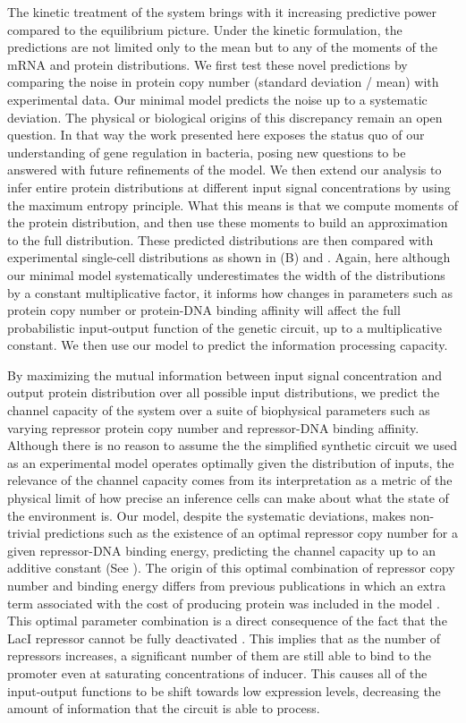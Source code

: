 The kinetic treatment of the system brings with it increasing predictive power
compared to the equilibrium picture. Under the kinetic formulation, the
predictions are not limited only to the mean but to any of the moments of the
mRNA and protein distributions. We first test these novel predictions by
comparing the noise in protein copy number (standard deviation / mean) with
experimental data. Our minimal model predicts the noise up to a systematic
deviation. The physical or biological origins of this discrepancy remain an
open question. In that way the work presented here exposes the status quo of
our understanding of gene regulation in bacteria, posing new questions to be
answered with future refinements of the model. We then extend our analysis to
infer entire protein distributions at different input signal concentrations by
using the maximum entropy principle. What this means is that we compute moments
of the protein distribution, and then use these moments to build an
approximation to the full distribution. These predicted distributions are then
compared with experimental single-cell distributions as shown in
(B) and . Again, here although our minimal
model systematically underestimates the width of the distributions by a
constant multiplicative factor, it informs how changes in parameters such as
protein copy number or protein-DNA binding affinity will affect the full
probabilistic input-output function of the genetic circuit, up to a
multiplicative constant. We then use our model to predict the information
processing capacity.

By maximizing the mutual information between input signal concentration and
output protein distribution over all possible input distributions, we predict
the channel capacity of the system over a suite of biophysical parameters such
as varying repressor protein copy number and repressor-DNA binding affinity.
Although there is no reason to assume the the simplified synthetic circuit we
used as an experimental model operates optimally given the distribution of
inputs, the relevance of the channel capacity comes from its interpretation as
a metric of the physical limit of how precise an inference cells can
make about what the state of the environment is. Our model, despite the
systematic deviations, makes non-trivial predictions such as the existence of
an optimal repressor copy number for a given repressor-DNA binding energy,
predicting the channel capacity up to an additive constant (See
). The origin of this optimal combination of repressor copy
number and binding energy differs from previous publications in which an extra
term associated with the cost of producing protein was included in the model
\cite{Tkacik2011}. This optimal parameter combination is a direct consequence
of the fact that the LacI repressor cannot be fully deactivated
\cite{Razo-Mejia2018}. This implies that as the number of repressors increases,
a significant number of them are still able to bind to the promoter even at
saturating concentrations of inducer. This causes all of the input-output
functions to be shift towards low expression levels, decreasing the amount of
information that the circuit is able to process.

